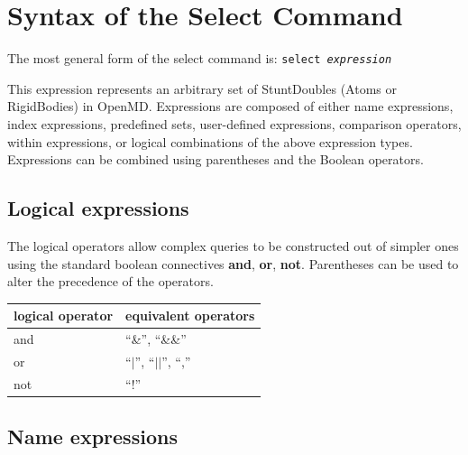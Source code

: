 \documentclass[letterpaper]{report}
\begin{document}
\section{\label{section:syntax}Syntax of the Select Command}

The most general form of the select command is: {\tt select {\it expression}}

This expression represents an arbitrary set of StuntDoubles (Atoms or
RigidBodies) in OpenMD. Expressions are composed of either name
expressions, index expressions, predefined sets, user-defined
expressions, comparison operators, within expressions, or logical
combinations of the above expression types. Expressions can be
combined using parentheses and the Boolean operators.

\subsection{\label{section:logical}Logical expressions}

The logical operators allow complex queries to be constructed out of
simpler ones using the standard boolean connectives {\bf and}, {\bf
or}, {\bf not}. Parentheses can be used to alter the precedence of the
operators.

\begin{center}
\begin{tabular}{|ll|}
\hline
{\bf logical operator} & {\bf equivalent operators}  \\  
\hline
and & ``\&'', ``\&\&'' \\
or & ``$|$'', ``$||$'', ``,'' \\
not & ``!''  \\
\hline
\end{tabular}
\end{center}

\subsection{\label{section:name}Name expressions}
\end{document}
